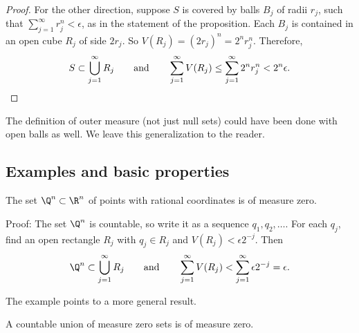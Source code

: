 \begin{proof}
For the other direction, suppose $S$ is covered by balls $B_j$
of radii $r_j$, such that $\sum_{j=1}^\infty r_j^n < \epsilon$,
as in the statement of the proposition.
Each $B_j$ is contained in an open cube $R_j$ of side $2r_j$.
So $V(R_j) = {(2 r_j)}^n = 2^n r_j^n$.  Therefore,
\begin{equation*}
S \subset \bigcup_{j=1}^\infty R_j \qquad \text{and} \qquad
\sum_{j=1}^\infty V(R_j)
\leq
\sum_{j=1}^\infty 2^n r_j^n < 2^n \epsilon. \qedhere
\end{equation*}
\end{proof}

The definition of outer measure (not just null sets)
could have been done with open balls
as well.  We leave this generalization to the reader.

\subsection{Examples and basic properties}

\begin{example}
The set $\Q^n \subset \R^n$ of points with rational coordinates
is of measure zero.

Proof:
The set $\Q^n$ is countable, so write it
as a sequence $q_1,q_2,\ldots$.  For each $q_j$, find an open rectangle
$R_j$ with $q_j \in R_j$ and $V(R_j) < \epsilon 2^{-j}$.  Then
\begin{equation*}
\Q^n \subset \bigcup_{j=1}^\infty R_j \qquad \text{and} \qquad
\sum_{j=1}^\infty V(R_j) <
\sum_{j=1}^\infty \epsilon 2^{-j} = \epsilon .
\end{equation*}
\end{example}

The example points to a more general result.

\begin{prop}
A countable union of measure zero sets is of measure zero.
\end{prop}

